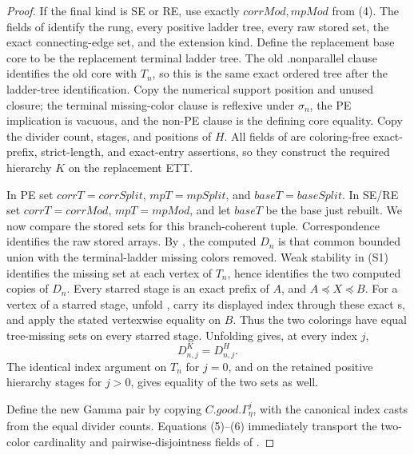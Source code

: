 \begin{proof}
If the final kind is SE or RE, use exactly
\(\mathit{corrMod},\mathit{mpMod}\) from (4).
The fields of  identify the
rung, every positive ladder tree, every raw stored set, the exact
connecting-edge set, and the extension kind.  Define the replacement
base core to be the replacement terminal ladder tree.  The old
.nonparallel clause identifies the old core with
\(T_n\), so this is the same exact ordered tree after the ladder-tree
identification.  Copy the numerical support position and unused closure;
the terminal missing-color clause is reflexive under \(\sigma_n\), the PE
implication is vacuous, and the non-PE clause is the defining core
equality.  Copy the divider count, stages, and positions of \(H\).
All fields of  are coloring-free exact-prefix,
strict-length, and exact-entry assertions, so they construct the required
hierarchy \(K\) on the replacement ETT.

In PE set \(\mathit{corrT}=\mathit{corrSplit}\),
\(\mathit{mpT}=\mathit{mpSplit}\), and
\(\mathit{baseT}=\mathit{baseSplit}\).  In SE/RE set
\(\mathit{corrT}=\mathit{corrMod}\),
\(\mathit{mpT}=\mathit{mpMod}\), and let \(\mathit{baseT}\) be the base
just rebuilt.  We now compare the stored sets for this branch-coherent
tuple.  Correspondence identifies the raw stored arrays.  By
, the computed \(D_n\) is that common
bounded union with the terminal-ladder missing colors removed.  Weak
stability in (S1) identifies the missing set at each vertex of \(T_n\),
hence identifies the two computed copies of \(D_n\).
Every starred stage is an exact prefix of \(A\), and
\(A\preccurlyeq X\preccurlyeq B\).  For a vertex of a starred stage,
unfold , carry its displayed index through
these exact s, and apply the stated
vertexwise equality on \(B\).  Thus the two colorings have equal
tree-missing sets on every starred stage.  Unfolding
 gives, at every index \(j\),
\[
                         D^K_{n,j}=D^H_{n,j}.                 \tag{5}
\]
The identical index argument on \(T_n\) for \(j=0\), and on the retained
positive hierarchy stages for \(j>0\), gives equality of the two
 sets as well.             \(\tag{6}\)

Define the new Gamma pair by copying
\(C.\mathit{good}.\Gamma^j_\eta\), with the canonical index casts from
the equal divider counts.  Equations (5)--(6) immediately transport the
two-color cardinality and pairwise-disjointness fields of
.


\end{proof}
